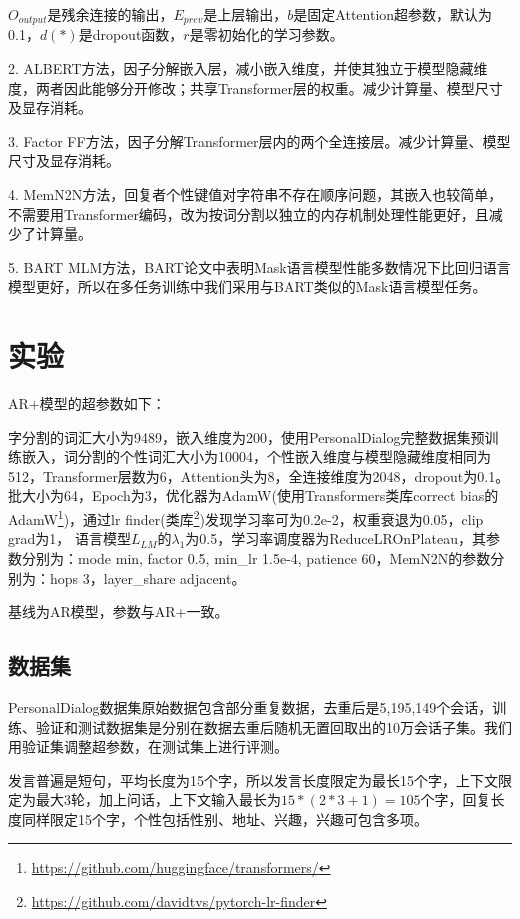 \documentclass[letterpaper]{article} %
\DeclareRobustCommand{\citeext}[1]{\cite[#1]{#1}}
\begin{document}
\begin{CJK*}{UTF8}{gbsn}
$O_{output}$是残余连接的输出，$E_{prev}$是上层输出，$b$是固定Attention超参数，默认为0.1，$d(*)$是dropout函数，$r$是零初始化的学习参数。

2. ALBERT\citeext{Lan2019}方法，因子分解嵌入层，减小嵌入维度，并使其独立于模型隐藏维度，两者因此能够分开修改；共享Transformer层的权重。减少计算量、模型尺寸及显存消耗。

3. Factor FF方法，因子分解Transformer层内的两个全连接层。减少计算量、模型尺寸及显存消耗。

4. MemN2N\citeext{Sukhbaatar2015}方法，回复者个性键值对字符串不存在顺序问题，其嵌入也较简单，不需要用Transformer编码，改为按词分割以独立的内存机制处理性能更好，且减少了计算量。

5. BART MLM\citeext{Lewis2019}方法，BART论文中表明Mask语言模型性能多数情况下比回归语言模型更好，所以在多任务训练中我们采用与BART类似的Mask语言模型任务。

\section[Experiments]{实验} 
AR+模型的超参数如下：

字分割的词汇大小为9489，嵌入维度为200，使用PersonalDialog完整数据集预训练嵌入，词分割的个性词汇大小为10004，个性嵌入维度与模型隐藏维度相同为512，Transformer层数为6，Attention头为8，全连接维度为2048，dropout为0.1。
批大小为64，Epoch为3，优化器为AdamW(使用Transformers类库correct bias的\\AdamW\footnote{\url{https://github.com/huggingface/transformers/}})，通过lr finder\citeext{Smith2015}(类库\footnote{\url{https://github.com/davidtvs/pytorch-lr-finder}})发现学习率可为0.2e-2，权重衰退为0.05，clip grad为1，
语言模型$L_{LM}$的$\lambda_1$为0.5，学习率调度器为ReduceLROnPlateau，其参数分别为：mode min, factor 0.5, min\_lr 1.5e-4, patience 60，MemN2N的参数分别为：hops 3，layer\_share adjacent。

基线为AR模型，参数与AR+一致。

\subsection[Datasets]{数据集} 
PersonalDialog数据集原始数据包含部分重复数据，去重后是5,195,149个会话，训练、验证和测试数据集是分别在数据去重后随机无置回取出的10万会话子集。我们用验证集调整超参数，在测试集上进行评测。

发言普遍是短句，平均长度为15个字，所以发言长度限定为最长15个字，上下文限定为最大3轮，加上问话，上下文输入最长为$15*(2*3+1)=105$个字，回复长度同样限定15个字，个性包括性别、地址、兴趣，兴趣可包含多项。


\end{CJK*}
\end{document}
